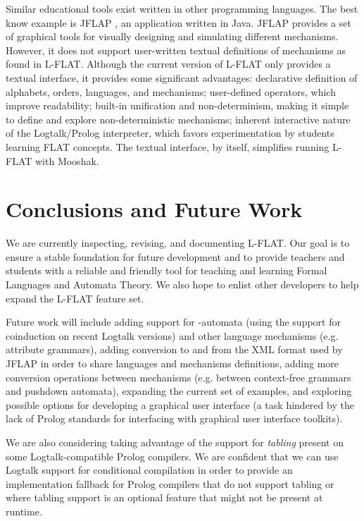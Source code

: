 \documentclass{llncs}
\begin{document}
Similar educational tools exist written in other programming languages. The best know example is  JFLAP \cite{jflap}, an application written in Java. JFLAP provides a set of graphical tools for visually designing and simulating different mechanisms. However, it does not support user-written textual definitions of mechanisms as found in L-FLAT. Although the current version of L-FLAT only provides a textual interface, it provides some significant advantages: declarative definition of alphabets, orders, languages, and mechanisms; user-defined operators, which improve readability; built-in unification and non-determinism, making it simple to define and explore non-deterministic mechanisms; inherent interactive nature of the Logtalk/Prolog interpreter, which favors experimentation by students learning FLAT concepts. The textual interface, by itself, simplifies running L-FLAT with Mooshak.


\section{Conclusions and Future Work}

We are currently inspecting, revising, and documenting L-FLAT. Our goal is to ensure a stable foundation for future development and to provide teachers and students with a reliable and friendly tool for teaching and learning Formal Languages and Automata Theory. We also hope to enlist other developers to help expand the L-FLAT feature set. 

Future work will include adding support for -automata (using the support for coinduction on recent Logtalk versions) and other language mechanisms (e.g. attribute grammars), adding conversion to and from the XML format used by JFLAP in order to share languages and mechanisms definitions, adding more conversion operations between mechanisms (e.g. between context-free grammars and pushdown automata), expanding the current set of examples, and exploring possible options for developing a graphical user interface (a task hindered by the lack of Prolog standards for interfacing with graphical  user interface toolkits).

We are also considering taking advantage of the support for \textsl{tabling} present on some Logtalk-compatible Prolog compilers. We are confident that we can use Logtalk support for conditional compilation in order to provide an implementation fallback for Prolog compilers that do not support tabling or where tabling support is an optional feature that might not be present at runtime.
\end{document}
